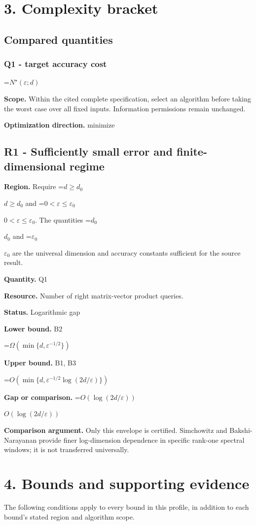 \documentclass[10pt,a4paper]{article}
\newcommand{\AtlasMath}[1]{\par\begingroup\centering\setbox0=\hbox{$\displaystyle #1$}\ifdim\wd0>1.4\linewidth\typeout{ATLAS WIDE FORMULA: \the\wd0}\fi\ifdim\wd0>\linewidth\resizebox{\linewidth}{!}{\box0}\else\box0\fi\par\endgroup}
\newcommand{\AtlasInlineMath}[1]{\begingroup\setbox0=\hbox{$#1$}\ifdim\wd0>.4\linewidth\endgroup\AtlasMath{#1}\else\endgroup$#1$\fi}
\begin{document}
\section{3. Complexity bracket}
\subsection{Compared quantities}
\subsubsection{Q1 - target accuracy cost}
\AtlasMath{N^\star(\varepsilon;d)}
\textbf{Scope.} Within the cited complete specification, select an algorithm before taking the worst case over all fixed inputs. Information permissions remain unchanged.

\textbf{Optimization direction.} minimize

\subsection{R1 - Sufficiently small error and finite-dimensional regime}
\textbf{Region.} Require \AtlasInlineMath{d\ge d_0} and \AtlasInlineMath{0<\varepsilon\le\varepsilon_0}. The quantities \AtlasInlineMath{d_0} and \AtlasInlineMath{\varepsilon_0} are the universal dimension and accuracy constants sufficient for the source result.

\textbf{Quantity.} Q1

\textbf{Resource.} Number of right matrix-vector product queries.

\textbf{Status.} Logarithmic gap

\textbf{Lower bound.} B2

\AtlasMath{\Omega(\min\{d,\varepsilon^{-1/2}\})}
\textbf{Upper bound.} B1, B3

\AtlasMath{O(\min\{d,\varepsilon^{-1/2}\log(2d/\varepsilon)\})}
\textbf{Gap or comparison.} \AtlasInlineMath{O(\log(2d/\varepsilon))}

\textbf{Comparison argument.} Only this envelope is certified. Simchowitz and Bakshi-Narayanan provide finer log-dimension dependence in specific rank-one spectral windows; it is not transferred universally.

\section{4. Bounds and supporting evidence}
The following conditions apply to every bound in this profile, in addition to each bound's stated region and algorithm scope.
\end{document}
